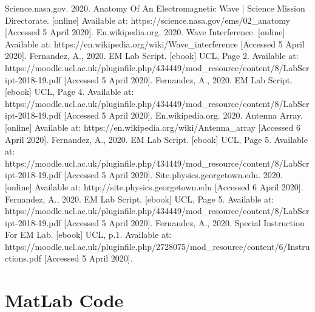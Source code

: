 \documentclass[12pt]{article}
\begin{document}
    \newpage   
    \begin{thebibliography}{}
    Science.nasa.gov. 2020. Anatomy Of An Electromagnetic Wave | Science Mission Directorate. [online] Available at: https://science.nasa.gov/ems/02\_anatomy [Accessed 5 April 2020].
    En.wikipedia.org. 2020. Wave Interference. [online] Available at: https://en.wikipedia.org/wiki/Wave\_interference [Accessed 5 April 2020].
    Fernandez, A., 2020. EM Lab Script. [ebook] UCL, Page 2. Available at: https://moodle.ucl.ac.uk/pluginfile.php/434449/mod\_resource/content/8/LabScript-2018-19.pdf [Accessed 5 April 2020].
    Fernandez, A., 2020. EM Lab Script. [ebook] UCL, Page 4. Available at: https://moodle.ucl.ac.uk/pluginfile.php/434449/mod\_resource/content/8/LabScript-2018-19.pdf [Accessed 5 April 2020].
    En.wikipedia.org. 2020. Antenna Array. [online] Available at: https://en.wikipedia.org/wiki/Antenna\_array [Accessed 6 April 2020].
    Fernandez, A., 2020. EM Lab Script. [ebook] UCL, Page 5. Available at: https://moodle.ucl.ac.uk/pluginfile.php/434449/mod\_resource/content/8/LabScript-2018-19.pdf [Accessed 5 April 2020].
    Site.physics.georgetown.edu. 2020. [online] Available at: http://site.physics.georgetown.edu [Accessed 6 April 2020].
    Fernandez, A., 2020. EM Lab Script. [ebook] UCL, Page 5. Available at: https://moodle.ucl.ac.uk/pluginfile.php/434449/mod\_resource/content/8/LabScript-2018-19.pdf [Accessed 5 April 2020].
    Fernandez, A., 2020. Special Instruction For EM Lab. [ebook] UCL, p.1. Available at: https://moodle.ucl.ac.uk/pluginfile.php/2728075/mod\_resource/content/6/Instructions.pdf [Accessed 5 April 2020].
    \end{thebibliography}
    
    \newpage
    \appendix
    \section{MatLab Code}
\end{document}
